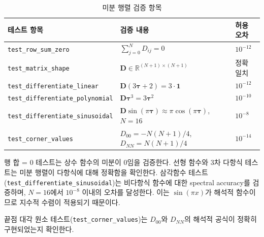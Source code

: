 \documentclass[11pt]{article}
\begin{document}
\begin{table}[htbp]
\centering
\caption{미분 행렬 검증 항목}
\label{tab:test_diffmat}
\small
\begin{tabular}{@{}lll@{}}
\toprule
테스트 항목 & 검증 내용 & 허용 오차 \\
\midrule
\texttt{test\_row\_sum\_zero} & $\sum_{j=0}^{N} D_{ij} = 0$ & $10^{-12}$ \\
\texttt{test\_matrix\_shape} & $\mathbf{D} \in \mathbb{R}^{(N+1) \times (N+1)}$ & 정확 일치 \\
\texttt{test\_differentiate\_linear} & $\mathbf{D}(3\boldsymbol{\tau} + 2) = 3 \cdot \mathbf{1}$ & $10^{-12}$ \\
\texttt{test\_differentiate\_polynomial} & $\mathbf{D} \boldsymbol{\tau}^3 = 3\boldsymbol{\tau}^2$ & $10^{-10}$ \\
\texttt{test\_differentiate\_sinusoidal} & $\mathbf{D} \sin(\pi\boldsymbol{\tau}) \approx \pi\cos(\pi\boldsymbol{\tau})$, $N = 16$ & $10^{-8}$ \\
\texttt{test\_corner\_values} & $D_{00} = -N(N+1)/4$, $D_{NN} = N(N+1)/4$ & $10^{-14}$ \\
\bottomrule
\end{tabular}
\end{table}

행 합 = 0 테스트는 상수 함수의 미분이 0임을 검증한다. 선형 함수와 3차 다항식 테스트는 미분 행렬이 다항식에 대해 정확함을 확인한다. 삼각함수 테스트(\texttt{test\_differentiate\_sinusoidal})는 비다항식 함수에 대한 spectral accuracy를 검증하며, $N = 16$에서 $10^{-8}$ 이내의 오차를 달성한다. 이는 $\sin(\pi x)$가 해석적 함수이므로 지수적 수렴이 적용되기 때문이다.

끝점 대각 원소 테스트(\texttt{test\_corner\_values})는 $D_{00}$와 $D_{NN}$의 해석적 공식이 정확히 구현되었는지 확인한다.



\end{document}
